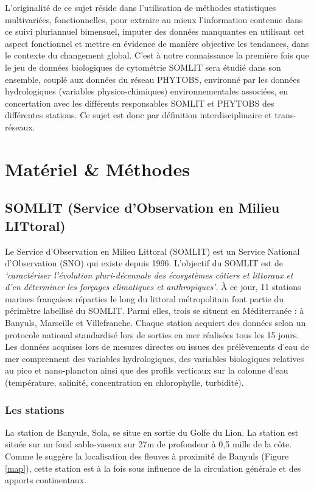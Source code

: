 \documentclass[12pt]{article}
\begin{document}
L’originalité de ce sujet réside dans l’utilisation de méthodes statistiques multivariées, fonctionnelles, pour extraire au mieux l’information contenue dans ce suivi pluriannuel bimensuel, imputer des données manquantes en utilisant cet aspect fonctionnel et mettre en évidence de manière objective les tendances, dans le contexte du changement global. C’est à notre connaissance la première fois que le jeu de données biologiques de cytométrie SOMLIT sera étudié dans son ensemble, couplé aux données du réseau PHYTOBS, environné par les données hydrologiques (variables physico-chimiques) environnementales associées, en concertation avec les différents responsables SOMLIT et PHYTOBS des différentes stations. Ce sujet est donc par définition interdisciplinaire et trans-réseaux.



\section{Matériel \& Méthodes}

\subsection{SOMLIT (Service d'Observation en Milieu LITtoral)}

Le Service d’Observation en Milieu Littoral (SOMLIT) est un Service National d’Observation (SNO) qui existe depuis 1996. L’objectif du SOMLIT est de \textit{‘caractériser l’évolution pluri-décennale des écosystèmes côtiers et littoraux et d’en déterminer les forçages climatiques et anthropiques’}. À ce jour, 11 stations marines françaises réparties le long du littoral métropolitain font partie du périmètre labellisé du SOMLIT. Parmi elles, trois se situent en Méditerranée : à Banyuls, Marseille et Villefranche. Chaque station acquiert des données selon un protocole national standardisé lors de sorties en mer réalisées tous les 15 jours. Les données acquises lors de mesures directes ou issues des prélèvements d’eau de mer comprennent des va\-riables hydrologiques, des variables biologiques relatives au pico et nano-plancton ainsi que des profils verticaux sur la colonne d'eau (température, salinité, concentration en chlorophylle, turbidité).

\subsubsection{Les stations}

La station de Banyuls, Sola, se situe en sortie du Golfe du Lion. La station est située sur un fond sablo-vaseux sur 27m de profondeur à 0,5 mille de la côte. Comme le suggère la localisation des fleuves à proximité de Banyuls (Figure \ref{map}), cette station est à la fois sous influence de la circulation générale et des apports continentaux. 
\end{document}

